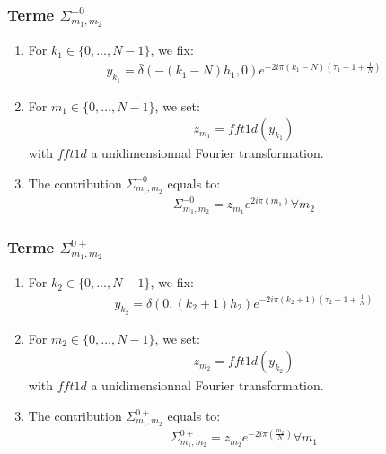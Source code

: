 \subsubsection{Terme $\Sigma_{m_1,m_2}^{-0}$}
\begin{enumerate}
\item For $k_1\in\{0,\hdots,N-1\}$, we fix:
\begin{align*}
y_{k_1}= \bar{\delta}(-(k_1-N)h_1,0)e^{-2i\pi (k_1-N)\left(\tau_1-1+\frac{1}{N}\right)}
\end{align*}
\item For $m_1\in\{0,\hdots,N-1\}$, we set:
\begin{align*}
  z_{m_1}=fft1d(y_{k_1})
\end{align*}
with $fft1d$ a unidimensionnal Fourier transformation.
\item The contribution $\Sigma_{m_1,m_2}^{-0}$ equals to:
\begin{align*}
  \Sigma_{m_1,m_2}^{-0}=z_{m_1}e^{2i\pi\left(m_1\right)} \forall m_2
\end{align*}
\end{enumerate}

\subsubsection{Terme $\Sigma_{m_1,m_2}^{0+}$}
\begin{enumerate}
\item For $k_2\in\{0,\hdots,N-1\}$, we fix:
\begin{align*}
y_{k_2}= \delta(0,(k_2+1)h_2)e^{-2i\pi (k_2+1)\left(\tau_2-1+\frac{1}{N}\right)}
\end{align*}
\item For $m_2\in\{0,\hdots,N-1\}$, we set:
\begin{align*}
  z_{m_2}=fft1d(y_{k_2})
\end{align*}
with $fft1d$ a unidimensionnal Fourier transformation.
\item The contribution $\Sigma_{m_1,m_2}^{0+}$ equals to:
\begin{align*}
  \Sigma_{m_1,m_2}^{0+}=z_{m_2}e^{-2i\pi\left(\frac{m_2}{N}\right)} \forall m_1
\end{align*}
\end{enumerate}

